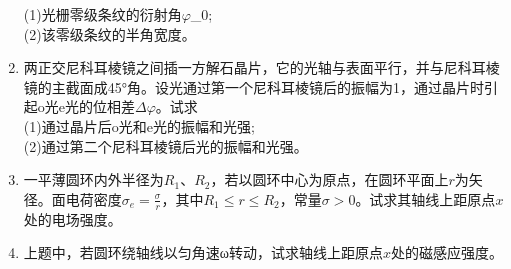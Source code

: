 \begin{enumerate}
(1)光栅零级条纹的衍射角$\varphi$_0;\\
(2)该零级条纹的半角宽度。
\item 两正交尼科耳棱镜之间插一方解石晶片，它的光轴与表面平行，并与尼科耳棱镜的主截面成45°角。设光通过第一个尼科耳棱镜后的振幅为1，通过晶片时引起o光e光的位相差$\Delta \varphi$。试求\\
(1)通过晶片后o光和e光的振幅和光强;\\
(2)通过第二个尼科耳棱镜后光的振幅和光强。
\item 一平薄圆环内外半径为$R_1$、$R_2$，若以圆环中心为原点，在圆环平面上$r$为矢径。面电荷密度$\sigma_e=\frac{\sigma}{r}$，其中$R_1\le r \le R_2$，常量$\sigma>0$。试求其轴线上距原点$x$处的电场强度。
\item 上题中，若圆环绕轴线以匀角速ω转动，试求轴线上距原点$x$处的磁感应强度。
\end{enumerate}